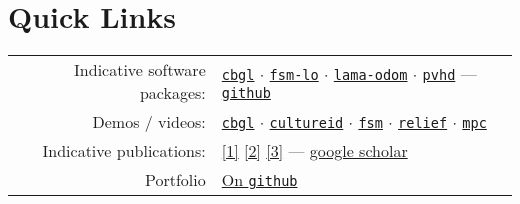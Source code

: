 \documentclass[a4paper,10pt,twoside]{article}
\begin{document}
\vfill

\section*{Quick Links}

\begin{tabular}{rp{12cm}}

Indicative software packages: &
\href{https://github.com/li9i/cbgl}{\texttt{cbgl}} $\cdot$
\href{https://github.com/li9i/fsm-lo}{\texttt{fsm-lo}} $\cdot$
\href{https://github.com/li9i/lama-odom}{\texttt{lama-odom}} $\cdot$
\href{https://github.com/li9i/pandora\_vision\_2014/tree/hydro-devel/pandora\_vision\_hole\_detector}{\texttt{pvhd}} ---  \href{https://github.com/li9i}{\texttt{github}} \\


Demos / videos: &
\href{https://www.youtube.com/watch?v=xaDKjI0WkDc}{\texttt{cbgl}} $\cdot$ \href{https://cultureid.web.auth.gr/?page\_id=200&lang=en}{\texttt{cultureid}} $\cdot$ \href{https://www.youtube.com/watch?v=hB4qsHCEXGI}{\texttt{fsm}} $\cdot$ \href{https://relief.web.auth.gr/}{\texttt{relief}} $\cdot$ \href{https://www.youtube.com/watch?v=937OZez1iN8}{\texttt{mpc}}\\

Indicative publications: &
\href{https://ieeexplore.ieee.org/abstract/document/9981228}{[1]}
\href{https://www.sciencedirect.com/science/article/abs/pii/S0921889021002323}{[2]}
\href{https://www.tandfonline.com/doi/full/10.1080/00207179.2018.1514129}{[3]} --- \href{https://scholar.google.com/citations?view\_op=list\_works\&hl=en\&user=9\_hI4hMAAAAJ}{google scholar}\\

  Portfolio & \href{https://docs.google.com/viewer?url=https://raw.githubusercontent.com/li9i/portfolio/master/portfolio.pdf}{On \texttt{github}}
\end{tabular}
\\

\vfill


\tableofcontents

\newpage

\vspace*{\fill}
\end{document}
